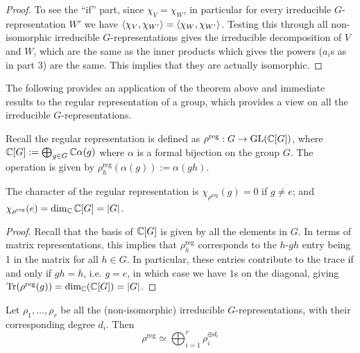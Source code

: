 \documentclass{article}
\begin{document}
\begin{corollary}
\begin{enumerate}[label=\arabic*)]
\begin{proof}
            To see the ``if'' part, since $\chi_V = \chi_W$, in particular for every irreducible $G$-representation $W'$ we have $\left\langle \chi_V, \chi_{W'} \right\rangle = \left\langle \chi_W, \chi_{W'} \right\rangle$. Testing this through all non-isomorphic irreducible $G$-representations gives the irreducible decomposition of $V$ and $W$, which are the same as the inner products which gives the powers ($a_i$s as in part 3) are the same. This implies that they are actually isomorphic. 
        \end{proof}
    \end{enumerate}
\end{corollary}

\textstart
The following provides an application of the theorem above and immediate results to the regular representation of a group, which provides a view on all the irreducible $G$-representations.

Recall the regular representation is defined as $\rho^{\mathrm{reg}}: G \to \mathrm{GL}(\mathbb{C}[G])$, where $\mathbb{C}[G] := \bigoplus_{g \in G} \mathbb{C} \alpha(g)$ where $\alpha$ is a formal bijection on the group $G$. The operation is given by $\rho^{\mathrm{reg}}_h (\alpha(g)) := \alpha(gh)$.

\begin{lemma}
    The character of the regular representation is $\chi_{\rho^{\mathrm{reg}}}(g) = 0$ if $g \neq e$; and $\chi_{\rho^{\mathrm{reg}}}(e) = \dim_{\mathbb{C}}\mathbb{C}[G] = \left|G\right|$.
\end{lemma}

\begin{proof}
    Recall that the basis of $\mathbb{C}[G]$ is given by all the elements in $G$. In terms of matrix representations, this implies that $\rho^{\mathrm{reg}}_h$ corresponds to the $h$-$gh$ entry being 1 in the matrix for all $h \in G$. In particular, these entries contribute to the trace if and only if $gh = h$, i.e. $g = e$, in which case we have $1$s on the diagonal, giving $\operatorname{Tr}(\rho^{\mathrm{reg}}(g)) = \dim_{\mathbb{C}}(\mathbb{C}[G]) = \left|G\right|$.
\end{proof}

\begin{proposition}\label{prop: decomposition of regular repr.}
    Let $\rho_1, \dots, \rho_r$ be all the (non-isomorphic) irreducible $G$-representations, with their corresponding degree $d_i$. Then 
    \[
        \rho^{\mathrm{reg}} \simeq \bigoplus_{i = 1}^r \rho_i^{\oplus d_i}
    \]
\end{proposition}
\end{document}
